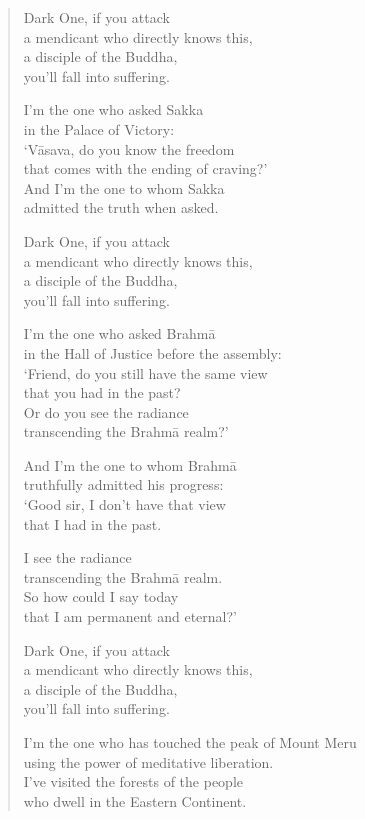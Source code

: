 \documentclass[12pt,openany]{book}%
\begin{document}
\begin{verse}
Dark One, if you attack \\
a mendicant who directly knows this, \\
a disciple of the Buddha, \\
you’ll fall into suffering. 

I’m the one who asked Sakka \\
in the Palace of Victory: \\
‘\textsanskrit{Vāsava}, do you know the freedom \\
that comes with the ending of craving?’ \\
And I’m the one to whom Sakka \\
admitted the truth when asked. 

Dark One, if you attack \\
a mendicant who directly knows this, \\
a disciple of the Buddha, \\
you’ll fall into suffering. 

I’m the one who asked \textsanskrit{Brahmā} \\
in the Hall of Justice before the assembly: \\
‘Friend, do you still have the same view \\
that you had in the past? \\
Or do you see the radiance \\
transcending the \textsanskrit{Brahmā} realm?’ 

And I’m the one to whom \textsanskrit{Brahmā} \\
truthfully admitted his progress: \\
‘Good sir, I don’t have that view \\
that I had in the past. 

I see the radiance \\
transcending the \textsanskrit{Brahmā} realm. \\
So how could I say today \\
that I am permanent and eternal?’ 

Dark One, if you attack \\
a mendicant who directly knows this, \\
a disciple of the Buddha, \\
you’ll fall into suffering. 

I’m the one who has touched the peak of Mount Meru \\
using the power of meditative liberation. \\
I’ve visited the forests of the people \\
who dwell in the Eastern Continent. 


\end{verse}
\end{document}

